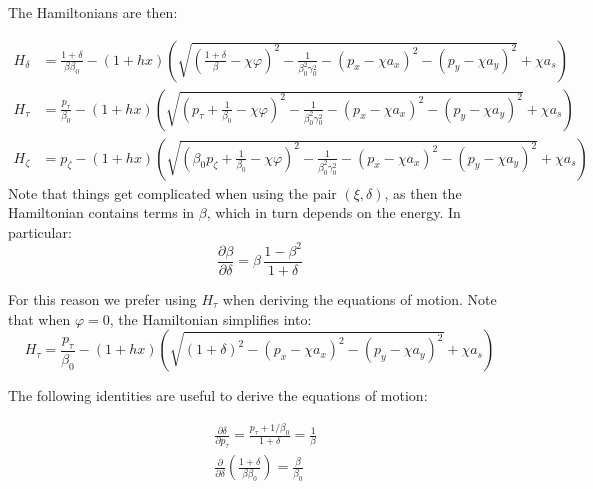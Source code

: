 The Hamiltonians are then:


\begin{align*}
 H_\delta   &= \frac{1+\delta}{\beta\beta_0} - (1+h x) \left(
      \sqrt{ \left(\frac{1+\delta}{\beta}-\chi\varphi\right)^2
           - \frac{1}{\beta_0^2\gamma_0^2} 
           - (p_x - \chi a_x)^2
           - (p_y - \chi a_y)^2}
       + \chi a_s
    \right) \\
 H_\tau   &= \frac{p_\tau}{\beta_0} - (1+h x) \left(
      \sqrt{ \left(p_\tau+\frac{1}{\beta_0}-\chi\varphi\right)^2
           - \frac{1}{\beta_0^2\gamma_0^2}
           - (p_x - \chi a_x)^2
           - (p_y - \chi a_y)^2}
       + \chi a_s
    \right) \\
  H_\zeta &= p_\zeta - (1+h x) \left(
      \sqrt{ \left(\beta_0 p_\zeta+\frac{1}{\beta_0}-\chi\varphi\right)^2
           - \frac{1}{\beta_0^2\gamma_0^2}
           - (p_x - \chi a_x)^2
           - (p_y - \chi a_y)^2}
       + \chi a_s
    \right)
\end{align*}
Note that things get complicated when using the pair $(\xi, \delta)$, as then the
Hamiltonian contains terms in $\beta$, which in turn depends on the energy.  In particular:
\begin{equation}
\frac{\partial \beta}{\partial \delta} =
    \beta\, \frac{1-\beta^2}{1+\delta}
\end{equation}

For this reason we prefer using $H_\tau$ when deriving the equations of motion. Note
that when $\varphi=0$, the Hamiltonian simplifies into:
\begin{equation}
H_\tau  =
\frac{p_\tau}{\beta_0} - (1+h x) \left(
      \sqrt{ \left(1+\delta\right)^2
           - (p_x - \chi a_x)^2
           - (p_y - \chi a_y)^2}
       + \chi a_s
    \right)
\end{equation}

The following identities are useful to derive the equations of motion:

\begin{align}
&\frac{\partial \delta}{\partial p_\tau} =
    \frac{p_\tau+1/\beta_0}{1+\delta} = \frac{1}{\beta} \\
&\frac{\partial}{\partial\delta}\left( 
    \frac{1+\delta}{\beta\beta_0}
  \right)=
    \frac{\beta}{\beta_0}
\end{align}

